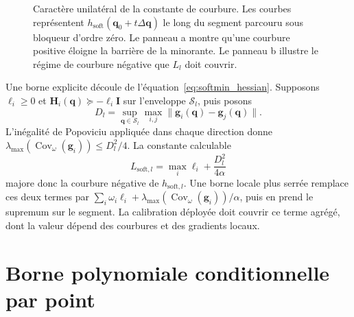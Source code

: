 \begin{figure}[htbp!]
    \caption[Caractère unilatéral de la constante de courbure]{Caractère unilatéral de la constante de courbure. Les courbes représentent $h_{\mathrm{soft}}(\mathbf{q}_0+t\Delta\mathbf{q})$ le long du segment parcouru sous bloqueur d'ordre zéro. Le panneau a montre qu'une courbure positive éloigne la barrière de la minorante. Le panneau b illustre le régime de courbure négative que $L_l$ doit couvrir.}
    \label{fig:courbure_unilaterale}
\end{figure}

Une borne explicite découle de l'équation~\eqref{eq:softmin_hessian}. Supposons $\ell_i\geq0$ et $\mathbf H_i(\mathbf q)\succeq-\ell_i\mathbf I$ sur l'enveloppe $\mathcal S_l$, puis posons
\begin{equation}
D_l=\sup_{\mathbf q\in\mathcal S_l}\max_{i,j}\|\mathbf g_i(\mathbf q)-\mathbf g_j(\mathbf q)\|.
\end{equation}
L'inégalité de Popoviciu appliquée dans chaque direction donne $\lambda_{\max}(\operatorname{Cov}_{\omega}(\mathbf g_i))\leq D_l^2/4$. La constante calculable
\begin{equation}\label{eq:L_soft_bound}
L_{\mathrm{soft},l}
=\max_i\ell_i+\frac{D_l^2}{4\alpha}
\end{equation}
majore donc la courbure négative de $h_{\mathrm{soft},l}$. Une borne locale plus serrée remplace ces deux termes par $\sum_i\omega_i\ell_i+\lambda_{\max}(\operatorname{Cov}_{\omega}(\mathbf g_i))/\alpha$, puis en prend le supremum sur le segment. La calibration déployée doit couvrir ce terme agrégé, dont la valeur dépend des courbures et des gradients locaux.

\section*{Borne polynomiale conditionnelle par point}

